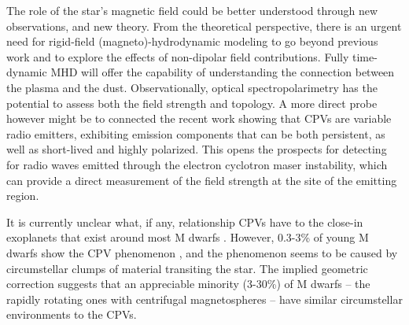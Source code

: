 \documentclass{nature3}
\begin{document}
The role of the star's magnetic field could be better understood
through new observations, and new theory.  From the theoretical
perspective, there is an urgent need for rigid-field
(magneto)-hydrodynamic modeling to go beyond previous work
\cite{Townsend2005,Townsend2008} and to explore the effects of
non-dipolar field contributions.
Fully time-dynamic MHD \cite{Daley-Yates2024} will offer the
capability of understanding the connection between the plasma and the
dust.  %
Observationally, optical spectropolarimetry has the potential to
assess both the field strength and topology.  A more direct probe
however might be to connected the recent work \cite{Kaur2024} showing
that CPVs are variable radio emitters, exhibiting emission components
that can be both persistent, as well as short-lived and highly
polarized.  This opens the prospects for detecting for radio waves
emitted through the electron cyclotron maser instability, which can
provide a direct measurement of the field strength at the site of the
emitting region.

It is currently unclear what, if any, relationship CPVs have to the
close-in exoplanets that exist around most M dwarfs
\cite{Dressing2015}.  However, 0.3-3\% of young M dwarfs show the CPV
phenomenon \cite{Rebull2020}, and the phenomenon seems to be caused by
circumstellar clumps of material transiting the star.  The implied
geometric correction suggests that an appreciable minority (3-30\%) of
M dwarfs -- the rapidly rotating ones with centrifugal magnetospheres
-- have similar circumstellar environments to the CPVs.




\end{document}
